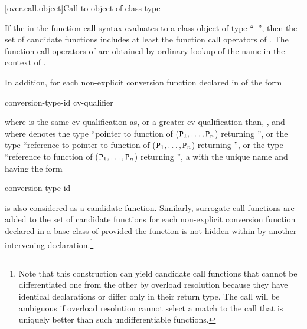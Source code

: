 [over.call.object]{Call to object of class type}

\pnum
If the
in the function call syntax evaluates
to a class object of type ``\cv{}~'',
then the set of candidate
functions includes at least the function call operators of
.
The
function call operators of
are obtained by ordinary lookup of
the name
in the context of
.

\pnum
In addition, for each non-explicit conversion function declared in  of the
form

\begin{ncsimplebnf}
 conversion-type-id \terminal{(\,)} cv-qualifier    \terminal{;}
\end{ncsimplebnf}

where
is the same cv-qualification as, or a greater cv-qualification than,
\cv{},
and where
denotes the type ``pointer to function
of ($\texttt{P}_1, \dotsc, \texttt{P}_n$) returning '',
or the type ``reference to pointer to function
of ($\texttt{P}_1, \dotsc, \texttt{P}_n$) returning '',
or the type
``reference to function of ($\texttt{P}_1, \dotsc, \texttt{P}_n$)
returning '', a  with the unique name
and having the form

\begin{ncbnf}
  \terminal{(} conversion-type-id \ %
 
\end{ncbnf}

is also considered as a candidate function.
Similarly, surrogate
call functions are added to the set of candidate functions for
each non-explicit conversion function declared in a base class of
provided the function is not hidden within
by another
intervening declaration.\footnote{Note that this construction can yield
candidate call functions that cannot be
differentiated one from the other by overload resolution because they have
identical
declarations or differ only in their return type.
The call will be ambiguous
if overload
resolution cannot select a match to the call that is uniquely better than such
undifferentiable functions.}

